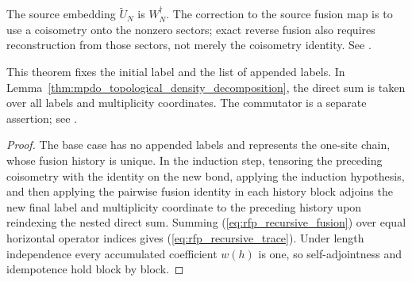 \begin{lemma}
    The source embedding $\widetilde U_N$ is $W_N^\dagger$.
    The correction to the source fusion map is to use a coisometry onto the
    nonzero sectors; exact reverse fusion also requires reconstruction from
    those sectors, not merely the coisometry identity. See
    \cite{gap:cpsv16_figure11_fusion_coisometry}.

    This theorem fixes the initial label and the list of appended labels.
    In Lemma~\ref{thm:mpdo_topological_density_decomposition}, the direct
    sum is taken over all labels and multiplicity coordinates. The commutator
    is a separate assertion; see
    \cite{gap:cpsv16_topological_projector_recursion}.
\end{lemma}
\begin{proof}\leanok{}
    The base case has no appended labels and represents the one-site chain,
    whose fusion history is unique. In the induction step, tensoring the
    preceding coisometry with the identity on the new bond, applying the
    induction hypothesis, and then applying the pairwise fusion
    identity in each history block adjoins the new final label and
    multiplicity coordinate to the preceding history upon reindexing the
    nested direct sum.
    Summing (\ref{eq:rfp_recursive_fusion}) over equal horizontal operator
    indices gives (\ref{eq:rfp_recursive_trace}). Under length independence
    every accumulated coefficient $w(h)$ is one, so self-adjointness and
    idempotence hold block by block.
\end{proof}

